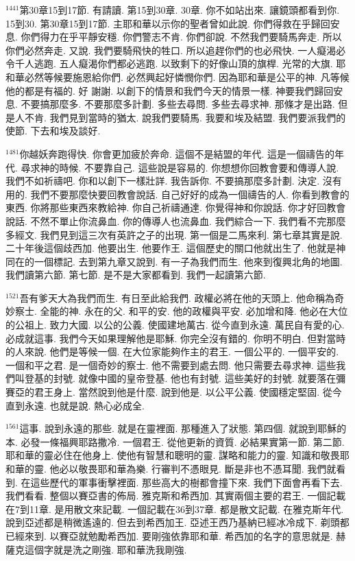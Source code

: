 \documentclass{book}
\begin{document}
$^{1441}$第30章15到17節.
有請讀.
第15到30章.
30章.
你不如站出來.
讓鏡頭都看到你.
15到30.
第30章15到17節.
主耶和華以示你的聖者曾如此說.
你們得救在乎歸回安息.
你們得力在乎平靜安穩.
你們警志不肯.
你們卻說.
不然我們要騎馬奔走.
所以你們必然奔走.
又說.
我們要騎飛快的牲口.
所以追趕你們的也必飛快.
一人癡渴必令千人逃跑.
五人癡渴你們都必逃跑.
以致剩下的好像山頂的旗桿.
光常的大旗.
耶和華必然等候要施恩給你們.
必然興起好憐憫你們.
因為耶和華是公平的神.
凡等候他的都是有福的.
好 謝謝.
以創下的情景和我們今天的情景一樣.
神要我們歸回安息.
不要搞那麼多.
不要那麼多計劃.
多些去尋問.
多些去尋求神.
那條才是出路.
但是人不肯.
我們見到當時的猶太.
說我們要騎馬.
我要和埃及結盟.
我們要派我們的使節.
下去和埃及談好.

$^{1481}$你越妖奔跑得快.
你會更加疲於奔命.
這個不是結盟的年代.
這是一個禱告的年代.
尋求神的時候.
不要靠自己.
這些說是容易的.
你想想你回教會要和傳導人說.
我們不如祈禱吧.
你和以創下一樣壯詳.
我告訴你.
不要搞那麼多計劃.
決定.
沒有用的.
我們不要那麼快要回教會說話.
自己好好的成為一個禱告的人.
你看到教會的東西.
你將那些東西來教給神.
你自己祈禱通達.
你覺得神和你說話.
你才好回教會說話.
不然不單止你流鼻血.
你的傳導人也流鼻血.
我們綜合一下.
我們看不完那麼多經文.
我們見到這三次有英許之子的出現.
第一個是二馬來利.
第七章其實是說.
二十年後這個歧西加.
他要出生.
他要作王.
這個歷史的關口他就出生了.
他就是神同在的一個標記.
去到第九章又說到.
有一子為我們而生.
他來到復興北角的地圖.
我們讀第六節.
第七節.
是不是大家都看到.
我們一起讀第六節.

$^{1521}$吾有爹天大為我們而生.
有日至此給我們.
政權必將在他的天頭上.
他命稱為奇妙察士.
全能的神.
永在的父.
和平的安.
他的政權與平安.
必加增和降.
他必在大位的公祖上.
致力大國.
以公的公義.
使國建地萬古.
從今直到永遠.
萬民自有愛的心.
必成就這事.
我們今天如果理解他是耶穌.
你完全沒有錯的.
你明不明白.
但對當時的人來說.
他們是等候一個.
在大位家能夠作主的君王.
一個公平的.
一個平安的.
一個和平之君.
是一個奇妙的察士.
他不需要到處去問.
他只需要去尋求神.
這些我們叫登基的封號.
就像中國的皇帝登基.
他也有封號.
這些美好的封號.
就要落在彌賽亞的君王身上.
當然說到他是什麼.
說到他是.
以公平公義.
使國穩定堅固.
從今直到永遠.
也就是說.
熱心必成全.

$^{1561}$這事.
說到永遠的那些.
就是在靈裡面.
那種進入了狀態.
第四個.
就說到耶穌的本.
必發一條福興耶路撒冷.
一個君王.
從他更新的資質.
必結果實第一節.
第二節.
耶和華的靈必住在他身上.
使他有智慧和聰明的靈.
謀略和能力的靈.
知識和敬畏耶和華的靈.
他必以敬畏耶和華為樂.
行審判不憑眼見.
斷是非也不憑耳聞.
我們就看到.
在這些歷代的軍事衝擊裡面.
那些高大的樹都會撞下來.
我們下面會再看下去.
我們看看.
整個以賽亞書的佈局.
雅克斯和希西加.
其實兩個主要的君王.
一個記載在7到11章.
是用散文來記載.
一個記載在36到37章.
都是散文記載.
在雅克斯年代.
說到亞述都是稍微遙遠的.
但去到希西加王.
亞述王西乃基納已經冰冷成下.
剃頭都已經來到.
以賽亞就勉勵希西加.
要剛強依靠耶和華.
希西加的名字的意思就是.
赫薩克這個字就是洗之剛強.
耶和華洗我剛強.
\end{document}
